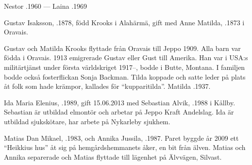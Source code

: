Nestor .1960  ---  Laina .1969




%
Gustav Isaksson, .1878, född Krooks i Alahärmä, gift med Anne Matilda, .1873 i Oravais.
\begin{jhchildren}
  \item {}
  \item {}
  \item {}
\end{jhchildren}
Gustav och Matilda Krooks flyttade från Oravais till Jeppo 1909. Alla barn var födda i Oravais. 1913 emigrerade Gustav eller Gust till Amerika. Han var i USA:s militärtjänst under första världskriget 1917--, bodde i Butte, Montana. I familjen bodde också fosterflickan Sonja Backman. Tilda koppade och satte leder på plats åt folk som hade krämpor, kallades för ``kupparitilda''. 	Matilda .1937.



%



%
Ida Maria Elenius, .1989, gift 15.06.2013 med Sebastian Alvik, .1988 i Kållby. Sebastian är utbildad elmontör och arbetar på Jeppo Kraft Andelslag. Ida är utbildad sjukskötare, har arbete på Nykarleby sjukhem.
\begin{jhchildren}
  \item {}
  \item {}
\end{jhchildren}


%
Matias Dan Mikael, .1983, och Annika Jussila, .1987. Paret byggde år 2009 ett ``Heikkius hus'' åt sig på hemgårdshemmanets åker, en bit från älven. Matias och Annika separerade och Matias flyttade till lägenhet på Älvvägen, Silvast.
